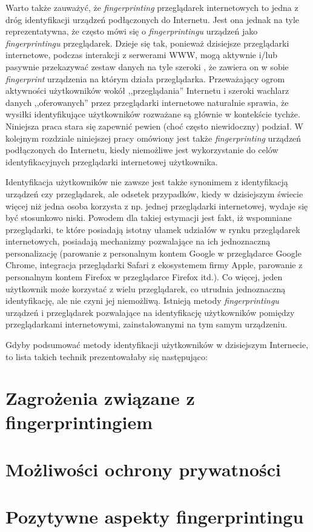 Warto także zauważyć, że \emph{fingerprinting} przeglądarek internetowych to
jedna z dróg identyfikacji urządzeń podłączonych do Internetu. Jest ona jednak
na tyle reprezentatywna, że często mówi się o \emph{fingerprintingu} urządzeń
jako \emph{fingerprintingu} przeglądarek. Dzieje się tak, ponieważ dzisiejsze
przeglądarki internetowe, podczas interakcji z serwerami WWW, mogą aktywnie
i/lub pasywnie przekazywać zestaw danych na tyle szeroki
\cite{eckersley2010unique}, że zawiera on w sobie \emph{fingerprint} urządzenia
na którym działa przeglądarka. Przeważający ogrom aktywności użytkowników wokół
,,przeglądania'' Internetu i szeroki wachlarz danych ,,oferowanych'' przez
przeglądarki internetowe naturalnie sprawia, że wysiłki identyfikujące
użytkowników rozważane są głównie w kontekście tychże. Niniejsza praca stara się
zapewnić pewien (choć często niewidoczny) podział. W kolejnym rozdziale
niniejszej pracy omówiony jest także \emph{fingerprinting} urządzeń podłączonych
do Internetu, kiedy niemożliwe jest wykorzystanie do celów identyfikacyjnych
przeglądarki internetowej użytkownika.

Identyfikacja użytkowników nie zawsze jest także synonimem z identyfikacją
urządzeń czy przeglądarek, ale odsetek przypadków, kiedy w dzisiejszym świecie
więcej niż jedna osoba korzysta z np. jednej przeglądarki internetowej, wydaje
się być stosunkowo niski. Powodem dla takiej estymacji jest fakt, iż wspomniane
przeglądarki, te które posiadają istotny ułamek udziałów w rynku przeglądarek
internetowych, posiadają mechanizmy pozwalające na ich jednoznaczną
personalizację (parowanie z personalnym kontem Google w przeglądarce Google
Chrome, integracja przeglądarki Safari z ekosystemem firmy Apple, parowanie z
personalnym kontem Firefox w przeglądarce Firefox itd.). Co więcej, jeden
użytkownik może korzystać z wielu przeglądarek, co utrudnia jednoznaczną
identyfikację, ale nie czyni jej niemożliwą. Istnieją metody
\emph{fingerprintingu} urządzeń i przeglądarek pozwalające na identyfikację
użytkowników pomiędzy przeglądarkami internetowymi, zainstalowanymi na tym samym
urządzeniu.

Gdyby podsumować metody identyfikacji użytkowników w dzisiejszym Internecie, to
lista takich technik prezentowałaby się następująco:

\section{Zagrożenia związane z fingerprintingiem}

\section{Możliwości ochrony prywatności}

\section{Pozytywne aspekty fingerprintingu}
